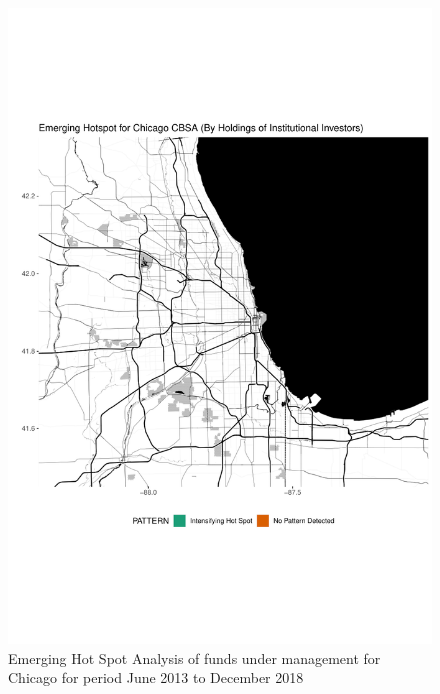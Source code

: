 \begin{figure}
	\centering
	\includegraphics[width=1\linewidth]{Figures/ChapterIV/Chi_Money_EH}
	\caption[Emerging Hot Spot Analysis of Funds Under Management for Chicago CBSA 2013-2018]{Emerging Hot Spot Analysis of funds under management for Chicago for period June 2013 to December 2018}
	\label{fig:Chicagonmoneyhotspot}
\end{figure}

